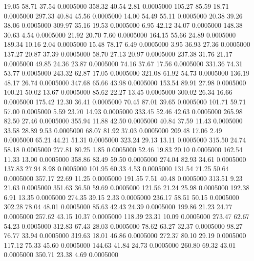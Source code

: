   19.05   58.71   37.54   0.0005000
 358.32   40.54    2.81   0.0005000
 105.27   85.59   18.71   0.0005000
 297.33   40.84   45.56   0.0005000
  14.00   54.49   55.11   0.0005000
  20.38   39.26   38.06   0.0005000
 309.97   35.16   19.53   0.0005000
   6.95   42.12   34.07   0.0005000
 148.38   30.63    4.54   0.0005000
  21.92   20.70    7.60   0.0005000
 164.15   55.66   24.89   0.0005000
 189.34   10.16    2.04   0.0005000
  15.48   78.17    6.49   0.0005000
   3.95   36.93   27.36   0.0005000
 137.27   20.87   37.39   0.0005000
  58.70   27.13   20.97   0.0005000
 237.38   31.76   21.17   0.0005000
  49.85   24.36   23.87   0.0005000
  74.16   37.67   17.56   0.0005000
 331.36   74.31   53.77   0.0005000
 243.32   62.87   17.05   0.0005000
 321.08   61.92   54.73   0.0005000
 136.19   48.17   26.74   0.0005000
 347.68   65.66   43.98   0.0005000
 153.54   89.91   27.98   0.0005000
 100.21   50.02   13.67   0.0005000
  85.62   22.27   13.45   0.0005000
 300.02   26.34   16.66   0.0005000
 175.42   12.30   36.41   0.0005000
  70.45   87.01   39.65   0.0005000
 101.71   59.71   57.00   0.0005000
   5.59   23.70   14.93   0.0005000
 333.45   52.46   42.63   0.0005000
 265.98   82.50   27.46   0.0005000
 355.94   11.88   42.50   0.0005000
  40.84   37.59   11.43   0.0005000
  33.58   28.89    9.53   0.0005000
  68.07   81.92   37.03   0.0005000
 209.48   17.06    2.49   0.0005000
  65.21   44.21   51.31   0.0005000
 323.24   29.13   13.11   0.0005000
 315.50   24.74   58.18   0.0005000
 277.81   80.25    1.85   0.0005000
  52.46   19.83   20.10   0.0005000
 162.54   11.33   13.00   0.0005000
 358.86   83.49   59.50   0.0005000
 274.04   82.93   34.61   0.0005000
 137.83   27.94    8.98   0.0005000
 101.95   60.33    4.53   0.0005000
 131.54   71.25   50.64   0.0005000
 357.17   22.69   11.25   0.0005000
 191.55    7.51   40.48   0.0005000
 313.51    9.23   21.63   0.0005000
 351.63   36.50   59.69   0.0005000
 121.56   21.24   25.98   0.0005000
 192.38    6.91   13.35   0.0005000
 274.35   39.15    2.33   0.0005000
 236.17   58.51   50.15   0.0005000
 302.28   78.04   48.01   0.0005000
  85.63   42.43   24.39   0.0005000
 199.86   21.23   24.77   0.0005000
 257.62   43.15   10.37   0.0005000
 118.39   23.31   10.09   0.0005000
 273.47   62.67   54.23   0.0005000
 312.83   67.43   28.03   0.0005000
  78.62   63.27   32.37   0.0005000
  98.27   76.77   33.94   0.0005000
 319.63   18.01   46.86   0.0005000
 272.37   80.10   29.19   0.0005000
 117.12   75.33   45.60   0.0005000
 144.63   41.84   24.73   0.0005000
 260.80   69.32   43.01   0.0005000
 350.71   23.38    4.69   0.0005000
